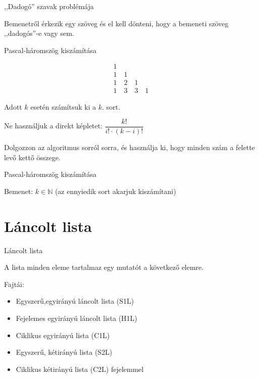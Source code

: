 \documentclass[hungarian]{beamer}
\begin{document}
\begin{frame}[t]{,,Dadogó'' szavak problémája}

Bemenetről érkezik egy szöveg és el kell dönteni, hogy a bemeneti szöveg ,,dadogós''-e vagy sem.

\end{frame}

\begin{frame}[t]{Pascal-háromszög kiszámítása}

\[
\begin{array}{c}
       1 \\
     1 \quad 1 \\
   1 \quad 2 \quad 1 \\
 1 \quad 3 \quad 3 \quad 1
\end{array}
\]

Adott $k$ esetén számítsuk ki a $k$. sort.

Ne használjuk a direkt képletet: $\dfrac{k!}{i!\cdot(k-i)!}$

Dolgozzon az algoritmus sorról sorra, és használja ki, hogy minden szám a felette levő kettő összege.

\end{frame}

\begin{frame}[t]{Pascal-háromszög kiszámítása}

Bemenet: $k \in \mathbb{N}$ (az ennyiedik sort akarjuk kiszámítani)

\end{frame}

\section{Láncolt lista}

\begin{frame}{Láncolt lista}

A lista minden eleme tartalmaz egy mutatót a következő elemre.

Fajtái:
\begin{itemize}
    \item Egyszerű,egyirányú láncolt lista (S1L)
    \item Fejelemes egyirányú láncolt lista (H1L)
    \item Ciklikus egyirányú lista (C1L)
    \item Egyszerű, kétirányú lista (S2L)
    \item Ciklikus kétirányú lista (C2L) fejelemmel
\end{itemize}

\end{frame}
\end{document}

